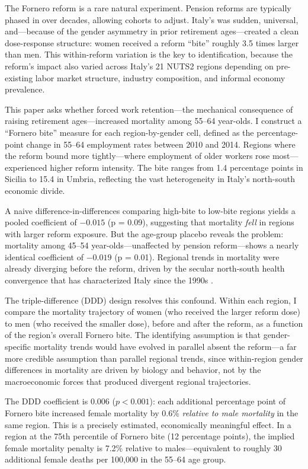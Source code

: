 \documentclass[12pt]{article}
\begin{document}
The Fornero reform is a rare natural experiment. Pension reforms are typically phased in over decades, allowing cohorts to adjust. Italy's was sudden, universal, and---because of the gender asymmetry in prior retirement ages---created a clean dose-response structure: women received a reform ``bite'' roughly 3.5 times larger than men. This within-reform variation is the key to identification, because the reform's impact also varied across Italy's 21 NUTS2 regions depending on pre-existing labor market structure, industry composition, and informal economy prevalence.

This paper asks whether forced work retention---the mechanical consequence of raising retirement ages---increased mortality among 55--64 year-olds. I construct a ``Fornero bite'' measure for each region-by-gender cell, defined as the percentage-point change in 55--64 employment rates between 2010 and 2014. Regions where the reform bound more tightly---where employment of older workers rose most---experienced higher reform intensity. The bite ranges from 1.4 percentage points in Sicilia to 15.4 in Umbria, reflecting the vast heterogeneity in Italy's north-south economic divide.

A naive difference-in-differences comparing high-bite to low-bite regions yields a pooled coefficient of $-0.015$ (p = 0.09), suggesting that mortality \textit{fell} in regions with larger reform exposure. But the age-group placebo reveals the problem: mortality among 45--54 year-olds---unaffected by pension reform---shows a nearly identical coefficient of $-0.019$ (p = 0.01). Regional trends in mortality were already diverging before the reform, driven by the secular north-south health convergence that has characterized Italy since the 1990s \citep{mazzonna2017}.

The triple-difference (DDD) design resolves this confound. Within each region, I compare the mortality trajectory of women (who received the larger reform dose) to men (who received the smaller dose), before and after the reform, as a function of the region's overall Fornero bite. The identifying assumption is that gender-specific mortality trends would have evolved in parallel absent the reform---a far more credible assumption than parallel regional trends, since within-region gender differences in mortality are driven by biology and behavior, not by the macroeconomic forces that produced divergent regional trajectories.

The DDD coefficient is 0.006 ($p < 0.001$): each additional percentage point of Fornero bite increased female mortality by 0.6\% \textit{relative to male mortality} in the same region. This is a precisely estimated, economically meaningful effect. In a region at the 75th percentile of Fornero bite (12 percentage points), the implied female mortality penalty is 7.2\% relative to males---equivalent to roughly 30 additional female deaths per 100,000 in the 55--64 age group.
\end{document}
